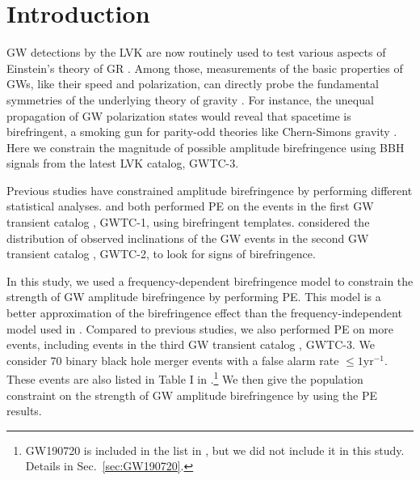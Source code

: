 \documentclass[aps,prd,twocolumn,superscriptaddress,preprintnumbers,floatfix,nofootinbib]{revtex4-2}
\begin{document}
\section{Introduction}
\label{sec:Introduction}
\Ac{GW} detections by the \ac{LVK} \citep{LIGO, Virgo, KAGRA} are now routinely used to test various aspects of Einstein's theory of \ac{GR} \citep{LIGOScientific:2016lio,LIGOScientific:2018dkp,LIGOScientific:2021sio}.
Among those, measurements of the basic properties of \acp{GW}, like their speed and polarization, can directly probe the fundamental symmetries of the underlying theory of gravity \citep{Will:2018bme}.
For instance, the unequal propagation of \ac{GW} polarization states would reveal that spacetime is birefringent, a smoking gun for parity-odd theories like Chern-Simons gravity \citep{Jackiw:2003pm, Alexander:2009tp, Sopuerta:2009iy}.
Here we constrain the magnitude of possible amplitude birefringence using \ac{BBH} signals from the latest \ac{LVK} catalog, GWTC-3.

Previous studies have constrained amplitude birefringence by performing different statistical analyses.
\citet{Yamada_2020} and \citet{Wang_2021} both performed \ac{PE} on the events in the first \ac{GW} transient catalog \citep{GWTC-1}, GWTC-1, using birefringent templates.
\citet{Okounkova_2022} considered the distribution of observed inclinations of the \ac{GW} events in the second \ac{GW} transient catalog \citep{GWTC-2}, GWTC-2, to look for signs of birefringence.

In this study, we used a frequency-dependent birefringence model to constrain the strength of \ac{GW} amplitude birefringence by performing \ac{PE}.
This model is a better approximation of the birefringence effect than the frequency-independent model used in \citet{Okounkova_2022}.
Compared to previous studies, we also performed \ac{PE} on more events, including events in the third \ac{GW} transient catalog \citep{GWTC-3}, GWTC-3.
We consider 70 binary black hole merger events with a false alarm rate $\leq1\mathrm{yr^{-1}}$.
These events are also listed in Table I in \citet{GWTC-3_population}.\footnote{
GW190720 is included in the list in \citet{GWTC-3_population}, but we did not include it in this study.
Details in Sec.~\ref{sec:GW190720}.}
We then give the population constraint on the strength of \ac{GW} amplitude birefringence by using the \ac{PE} results.
\end{document}
